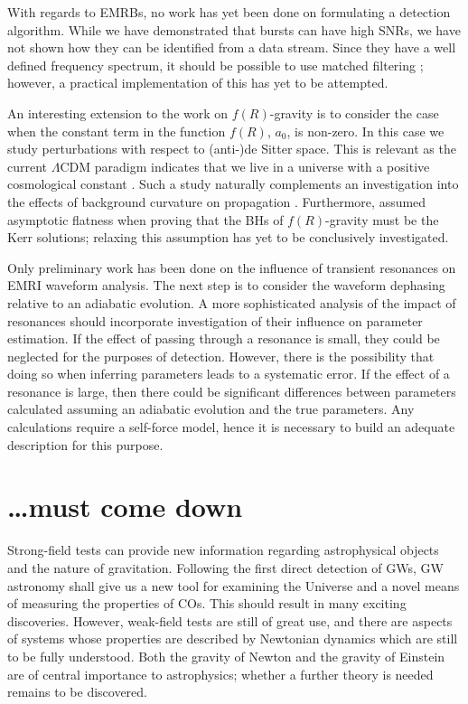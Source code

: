With regards to EMRBs, no work has yet been done on formulating a detection algorithm. While we have demonstrated that bursts can have high SNRs, we have not shown how they can be identified from a data stream. Since they have a well defined frequency spectrum, it should be possible to use matched filtering \citep[cf.][]{Feroz2010}; however, a practical implementation of this has yet to be attempted.

An interesting extension to the work on $f(R)$-gravity is to consider the case when the constant term in the function $f(R)$, $a_0$, is non-zero. In this case we study perturbations with respect to (anti-)de Sitter space. This is relevant as the current $\Lambda$CDM paradigm indicates that we live in a universe with a positive cosmological constant \citep{Komatsu2011,Hinshaw2012,Ade2013b}. Such a study naturally complements an investigation into the effects of background curvature on propagation \citep{Yang2011}. Furthermore, \citet{Sotiriou2011} assumed asymptotic flatness when proving that the BHs of $f(R)$-gravity must be the Kerr solutions; relaxing this assumption has yet to be conclusively investigated.

Only preliminary work has been done on the influence of transient resonances on EMRI waveform analysis. The next step is to consider the waveform dephasing relative to an adiabatic evolution. A more sophisticated analysis of the impact of resonances should incorporate investigation of their influence on parameter estimation. If the effect of passing through a resonance is small, they could be neglected for the purposes of detection. However, there is the possibility that doing so when inferring parameters leads to a systematic error. If the effect of a resonance is large, then there could be significant differences between parameters calculated assuming an adiabatic evolution and the true parameters. Any calculations require a self-force model, hence it is necessary to build an adequate description for this purpose.

\section{\ldots must come down}

Strong-field tests can provide new information regarding astrophysical objects and the nature of gravitation. Following the first direct detection of GWs, GW astronomy shall give us a new tool for examining the Universe and a novel means of measuring the properties of COs. This should result in many exciting discoveries. However, weak-field tests are still of great use, and there are aspects of systems whose properties are described by Newtonian dynamics which are still to be fully understood. Both the gravity of Newton and the gravity of Einstein are of central importance to astrophysics; whether a further theory is needed remains to be discovered.